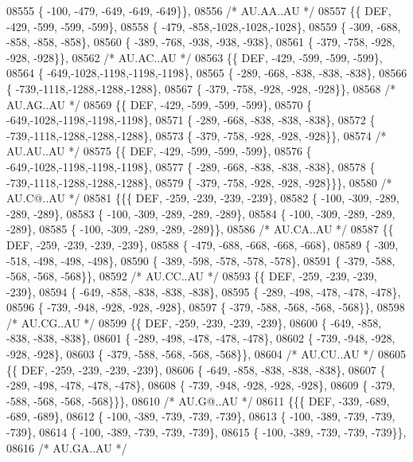 \begin{DoxyCode}
08555 \{ -100, -479, -649, -649, -649\}\},
08556 \textcolor{comment}{/* AU.AA..AU */}
08557 \{\{  DEF, -429, -599, -599, -599\},
08558 \{ -479, -858,-1028,-1028,-1028\},
08559 \{ -309, -688, -858, -858, -858\},
08560 \{ -389, -768, -938, -938, -938\},
08561 \{ -379, -758, -928, -928, -928\}\},
08562 \textcolor{comment}{/* AU.AC..AU */}
08563 \{\{  DEF, -429, -599, -599, -599\},
08564 \{ -649,-1028,-1198,-1198,-1198\},
08565 \{ -289, -668, -838, -838, -838\},
08566 \{ -739,-1118,-1288,-1288,-1288\},
08567 \{ -379, -758, -928, -928, -928\}\},
08568 \textcolor{comment}{/* AU.AG..AU */}
08569 \{\{  DEF, -429, -599, -599, -599\},
08570 \{ -649,-1028,-1198,-1198,-1198\},
08571 \{ -289, -668, -838, -838, -838\},
08572 \{ -739,-1118,-1288,-1288,-1288\},
08573 \{ -379, -758, -928, -928, -928\}\},
08574 \textcolor{comment}{/* AU.AU..AU */}
08575 \{\{  DEF, -429, -599, -599, -599\},
08576 \{ -649,-1028,-1198,-1198,-1198\},
08577 \{ -289, -668, -838, -838, -838\},
08578 \{ -739,-1118,-1288,-1288,-1288\},
08579 \{ -379, -758, -928, -928, -928\}\}\},
08580 \textcolor{comment}{/* AU.C@..AU */}
08581 \{\{\{  DEF, -259, -239, -239, -239\},
08582 \{ -100, -309, -289, -289, -289\},
08583 \{ -100, -309, -289, -289, -289\},
08584 \{ -100, -309, -289, -289, -289\},
08585 \{ -100, -309, -289, -289, -289\}\},
08586 \textcolor{comment}{/* AU.CA..AU */}
08587 \{\{  DEF, -259, -239, -239, -239\},
08588 \{ -479, -688, -668, -668, -668\},
08589 \{ -309, -518, -498, -498, -498\},
08590 \{ -389, -598, -578, -578, -578\},
08591 \{ -379, -588, -568, -568, -568\}\},
08592 \textcolor{comment}{/* AU.CC..AU */}
08593 \{\{  DEF, -259, -239, -239, -239\},
08594 \{ -649, -858, -838, -838, -838\},
08595 \{ -289, -498, -478, -478, -478\},
08596 \{ -739, -948, -928, -928, -928\},
08597 \{ -379, -588, -568, -568, -568\}\},
08598 \textcolor{comment}{/* AU.CG..AU */}
08599 \{\{  DEF, -259, -239, -239, -239\},
08600 \{ -649, -858, -838, -838, -838\},
08601 \{ -289, -498, -478, -478, -478\},
08602 \{ -739, -948, -928, -928, -928\},
08603 \{ -379, -588, -568, -568, -568\}\},
08604 \textcolor{comment}{/* AU.CU..AU */}
08605 \{\{  DEF, -259, -239, -239, -239\},
08606 \{ -649, -858, -838, -838, -838\},
08607 \{ -289, -498, -478, -478, -478\},
08608 \{ -739, -948, -928, -928, -928\},
08609 \{ -379, -588, -568, -568, -568\}\}\},
08610 \textcolor{comment}{/* AU.G@..AU */}
08611 \{\{\{  DEF, -339, -689, -689, -689\},
08612 \{ -100, -389, -739, -739, -739\},
08613 \{ -100, -389, -739, -739, -739\},
08614 \{ -100, -389, -739, -739, -739\},
08615 \{ -100, -389, -739, -739, -739\}\},
08616 \textcolor{comment}{/* AU.GA..AU */}

\end{DoxyCode}
